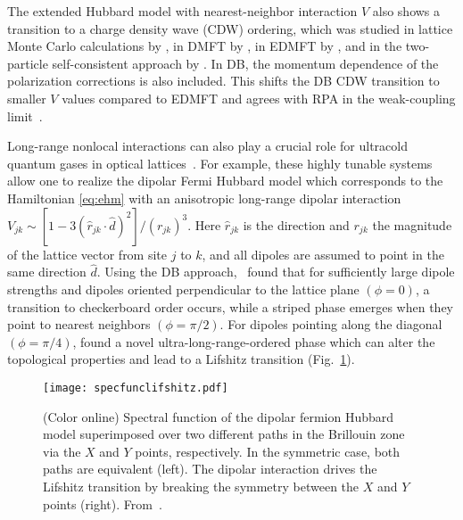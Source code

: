 \documentclass[rmp,aps,reprint,amsmath,amssymb,superscriptaddress,showpacs,nofootinbib]{revtex4-1}
\begin{document}
The extended Hubbard model with nearest-neighbor interaction $V$ also shows a transition to a charge density wave (CDW) ordering, which was studied in   lattice Monte Carlo calculations by , in DMFT by , in EDMFT by , and in the  two-particle self-consistent approach by . In DB, the momentum dependence of the polarization corrections is also included. This shifts the DB CDW transition to smaller $V$ values compared to EDMFT and agrees with RPA in the weak-coupling limit~\cite{vanLoon2014a}.

Long-range nonlocal interactions can also play a crucial role for ultracold quantum gases in optical lattices~\cite{Lewenstein2012,Bloch2008,Bloch2012}. For example, these highly tunable systems allow one to realize the dipolar Fermi Hubbard model \cite{Lewenstein2012,Baranov2008,Lahaye2009,Zoller2012} which corresponds to the Hamiltonian \eqref{eq:ehm} with an anisotropic long-range dipolar interaction $V_{jk} \sim \left[1-3(\hat{r}_{jk}\cdot \hat{d})^2 \right]/(r_{jk})^3$. Here $\hat{r}_{jk}$ is the direction and $r_{jk}$ the magnitude of the lattice vector from site $j$ to $k$, and all dipoles are assumed to point in the same direction $\hat{d}$. Using the DB approach,~ found that for sufficiently large dipole strengths and dipoles oriented perpendicular to the lattice plane $(\phi=0)$, a transition to checkerboard order occurs, while a striped phase emerges when they point to nearest neighbors $(\phi=\pi/2)$. For dipoles pointing along the diagonal $(\phi=\pi/4)$,  found a novel ultra-long-range-ordered phase which can alter the topological properties and lead to a Lifshitz transition (Fig.~\ref{fig:specfunclifshitz}).

\begin{figure}[t]
\begin{center}
  \texttt{[image: specfunclifshitz.pdf]} 
\end{center}
    \caption{(Color online) Spectral function of the dipolar fermion Hubbard model superimposed over two different paths in the Brillouin zone via the $X$ and $Y$ points, respectively. In the symmetric case, both paths are equivalent (left). The dipolar interaction drives the Lifshitz transition by breaking the symmetry between the $X$ and $Y$ points (right). From~.}
  \label{fig:specfunclifshitz}
\end{figure}
\end{document}
